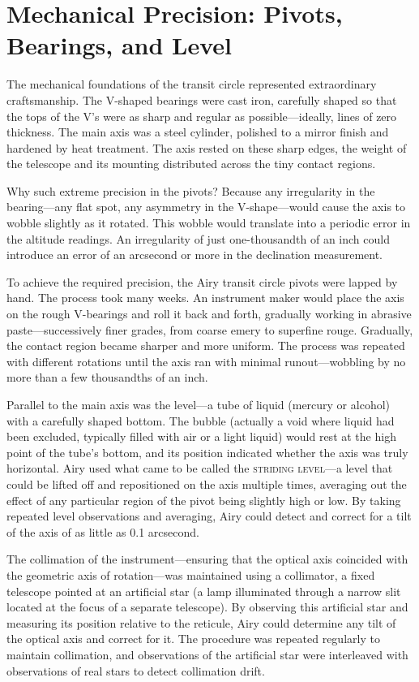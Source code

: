 \section{Mechanical Precision: Pivots, Bearings, and Level}

The mechanical foundations of the transit circle represented extraordinary craftsmanship. The V-shaped bearings were cast iron, carefully shaped so that the tops of the V's were as sharp and regular as possible—ideally, lines of zero thickness. The main axis was a steel cylinder, polished to a mirror finish and hardened by heat treatment. The axis rested on these sharp edges, the weight of the telescope and its mounting distributed across the tiny contact regions.

Why such extreme precision in the pivots? Because any irregularity in the bearing—any flat spot, any asymmetry in the V-shape—would cause the axis to wobble slightly as it rotated. This wobble would translate into a periodic error in the altitude readings. An irregularity of just one-thousandth of an inch could introduce an error of an arcsecond or more in the declination measurement.

To achieve the required precision, the Airy transit circle pivots were lapped by hand. The process took many weeks. An instrument maker would place the axis on the rough V-bearings and roll it back and forth, gradually working in abrasive paste—successively finer grades, from coarse emery to superfine rouge. Gradually, the contact region became sharper and more uniform. The process was repeated with different rotations until the axis ran with minimal runout—wobbling by no more than a few thousandths of an inch.

Parallel to the main axis was the level—a tube of liquid (mercury or alcohol) with a carefully shaped bottom. The bubble (actually a void where liquid had been excluded, typically filled with air or a light liquid) would rest at the high point of the tube's bottom, and its position indicated whether the axis was truly horizontal. Airy used what came to be called the \textsc{striding level}—a level that could be lifted off and repositioned on the axis multiple times, averaging out the effect of any particular region of the pivot being slightly high or low. By taking repeated level observations and averaging, Airy could detect and correct for a tilt of the axis of as little as 0.1 arcsecond.

The collimation of the instrument—ensuring that the optical axis coincided with the geometric axis of rotation—was maintained using a collimator, a fixed telescope pointed at an artificial star (a lamp illuminated through a narrow slit located at the focus of a separate telescope). By observing this artificial star and measuring its position relative to the reticule, Airy could determine any tilt of the optical axis and correct for it. The procedure was repeated regularly to maintain collimation, and observations of the artificial star were interleaved with observations of real stars to detect collimation drift.

